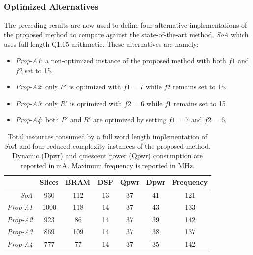 		\subsubsection{Optimized Alternatives}

The preceding results are now used to define four alternative implementations of the proposed method to  compare against the state-of-the-art method, \textit{SoA} which uses full length Q1.15 arithmetic. These alternatives are namely:
\begin{itemize}
\item \textit{Prop-A1}: a non-optimized instance of the proposed method with both $f1$ and $f2$ set to 15.
\item \textit{Prop-A2}: only $P'$ is optimized with $f1$ = 7 while $f2$ remains set to 15.
\item \textit{Prop-A3}: only $R'$ is optimized with  $f2$ = 6 while $f1$ remains set to 15.
\item \textit{Prop-A4}: both $P'$ and $R'$ are optimized by setting $f1$ = 7 and $f2$ = 6.
\end{itemize}


\begin{table}[h]
	\centering
	\caption{ Total resources consumed by a full word length implementation of \textit{SoA} and four reduced complexity instances of the proposed method. Dynamic (Dpwr) and quiescent power (Qpwr) consumption are reported in mA. Maximum frequency is reported in MHz.}
	\label{tab:Int_Imp_Rpt}
	\begin{tabular}{r|c|c|c|c|c|c}
        \hline \hline
    			 {}	&  {Slices} &  {BRAM} &  {DSP}&  {Qpwr}& {Dpwr}& {Frequency}\\
	\hline
		\textit{SoA} 	& 930 	& 112 	& 13	& 37	& 41 & 121 \\
		\textit{Prop-A1}	& 1000 	& 118	& 14 	& 37 	& 43 & 133 \\
		\textit{Prop-A2}	& 923 	& 86	& 14 	& 37	& 39 & 142 \\
		\textit{Prop-A3}	& 869  	& 109  	& 14	& 37 	& 38 & 137 \\
		\textit{Prop-A4}	& 777  	& 77  	& 14	& 37 	& 35 & 142 \\
	\hline \hline
    \end{tabular}
\end{table}


